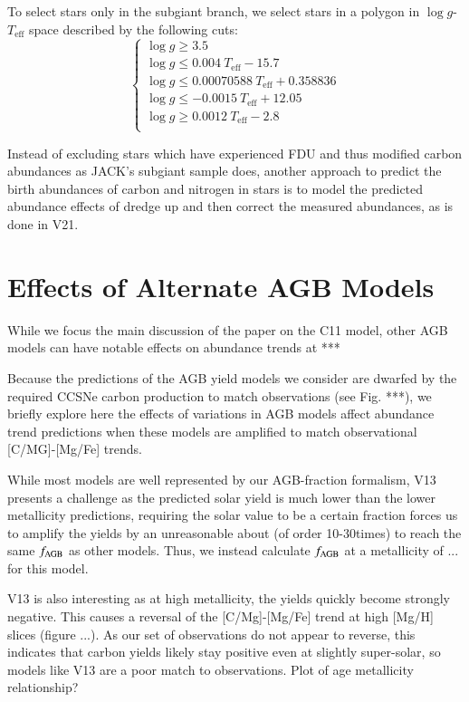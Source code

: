 \documentclass[12pt,oneside]{book}
\begin{document}
To select stars only in the subgiant branch, we select stars in a polygon in $\log g$-$T_\text{eff}$ space described by the following cuts:
\begin{equation}
\begin{cases}
\log g \geq 3.5 \\
\log g \leq 0.004\ T_\text{eff} - 15.7 \\
\log g \leq 0.00070588\ T_\text{eff} + 0.358836 \\
\log g \leq -0.0015\ T_\text{eff} + 12.05 \\
\log g \geq 0.0012\ T_\text{eff} - 2.8 \\
\end{cases}
\end{equation}

Instead of excluding stars which have experienced FDU and thus modified carbon abundances as JACK's subgiant sample does, another approach to predict the birth abundances of carbon and nitrogen in stars is to model the predicted abundance effects of dredge up and then correct the measured abundances, as is done in V21. 


\chapter{Effects of Alternate AGB Models}\label{sec:alt_agb}


While we focus the main discussion of the paper on the C11 model, other AGB models can have notable effects on abundance trends at ***

Because the predictions of the AGB yield models we consider are dwarfed by the
required CCSNe carbon production to match observations (see Fig. ***), we briefly explore here the effects of variations in AGB models affect abundance trend predictions when these models are amplified to match observational [C/MG]-[Mg/Fe] trends. 

While most models are well represented by our AGB-fraction formalism, V13 presents a challenge as the predicted solar yield is much lower than the lower metallicity predictions, requiring the solar value to be a certain fraction forces us to amplify the yields by an unreasonable about (of order 10-30times) to reach the same $f_{\rm AGB}$ as other models. Thus, we instead calculate $f_{\rm AGB}$ at a metallicity of ... for this model. 

V13 is also interesting as at high metallicity, the yields quickly become strongly negative. This causes a reversal of the [C/Mg]-[Mg/Fe] trend at high [Mg/H] slices (figure ...). As our set of observations do not appear to reverse, this indicates that carbon yields likely stay positive even at slightly super-solar, so models like V13 are a poor match to observations. 
Plot of age metallicity relationship?
\end{document}
